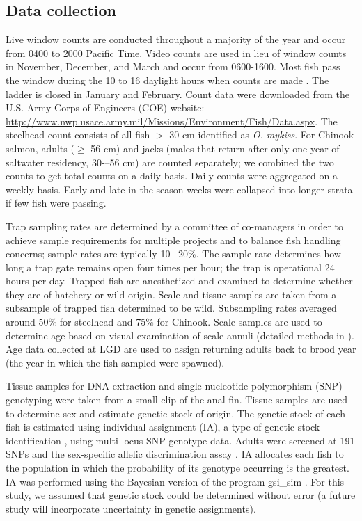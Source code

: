 \documentclass[%
                leqno,         %
%
]{nrc1}                          %
\begin{document}
\subsection*{Data collection}
Live window counts are conducted throughout a majority of the year and occur from 0400 to 2000 Pacific Time. Video counts are used in lieu of window counts in November, December, and March and occur from 0600-1600. Most fish pass the window during the 10 to 16 daylight hours when counts are made \citep{Cassinelli2012}. The ladder is closed in January and February. Count data were downloaded from the U.S. Army Corps of Engineers (COE) website: \url{http://www.nwp.usace.army.mil/Missions/Environment/Fish/Data.aspx}. The steelhead count consists of all fish $>$ 30 cm identified as \textit{O. mykiss}. For Chinook salmon, adults ($\geq$ 56 cm) and jacks (males that return after only one year of saltwater residency, 30-–56 cm) are counted separately; we combined the two counts to get total counts on a daily basis. Daily counts were aggregated on a weekly basis. Early and late in the season weeks were collapsed into longer strata if few fish were passing.

Trap sampling rates are determined by a committee of co-managers in order to achieve sample requirements for multiple projects and to balance fish handling concerns; sample rates are typically 10-–20\%. The sample rate determines how long a trap gate remains open four times per hour; the trap is operational 24 hours per day. Trapped fish are anesthetized and examined to determine whether they are of hatchery or wild origin. Scale and tissue samples are taken from a subsample of trapped fish determined to be wild. Subsampling rates averaged around 50\% for steelhead and 75\% for Chinook. Scale samples are used to determine age based on visual examination of scale annuli (detailed methods in \citet{Schrader2013}). Age data collected at LGD are used to assign returning adults back to brood year (the year in which the fish sampled were spawned).

Tissue samples for DNA extraction and single nucleotide polymorphism (SNP) genotyping were taken from a small clip of the anal fin.  Tissue samples are used to determine sex and estimate genetic stock of origin. The genetic stock of each fish is estimated using individual assignment (IA), a type of genetic stock identification  \citep{Pella1987,Shaklee1999}, using multi-locus SNP genotype data.  Adults were screened at 191 SNPs and the sex-specific allelic discrimination assay \citep{Campbell2012}. IA allocates each fish to the population in which the probability of its genotype occurring is the greatest. IA was performed using the Bayesian version of the program gsi\_sim \citep{Anderson2008,Anderson2010}.  For this study, we assumed that genetic stock could be determined without error (a future study will incorporate uncertainty in genetic assignments).
\end{document}
